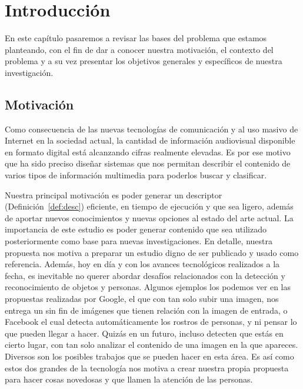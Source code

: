 \chapter[Introducción]{Introducción}\label{ch:capitulo1}
En este capítulo pasaremos a revisar las bases del problema que estamos planteando, con el fin de dar a conocer nuestra motivación, el contexto del problema y a su vez presentar los objetivos generales y específicos de nuestra investigación.


\section{Motivación}\label{chsub:Motivación}

Como consecuencia de las nuevas tecnologías de comunicación y al uso masivo de Internet en la sociedad actual, la cantidad de información audiovisual disponible en formato digital está alcanzando cifras realmente elevadas. Es por ese motivo que ha sido preciso diseñar sistemas que nos permitan describir el contenido de varios tipos de información multimedia para poderlos buscar y clasificar. 

Nuestra principal motivación es poder generar un descriptor (Definición~\ref{def:desc}) eficiente, en tiempo de ejecución y que sea ligero, además de aportar nuevos conocimientos y nuevas opciones al estado del arte actual. La importancia de este estudio es poder generar contenido que sea utilizado posteriormente como base para nuevas investigaciones. En detalle, nuestra propuesta nos motiva a preparar un estudio digno de ser publicado y usado como referencia. Además, hoy en día y con los avances tecnológicos realizados a la fecha, es inevitable no querer abordar desafíos relacionados con la detección y reconocimiento de objetos y personas. Algunos ejemplos los podemos ver en las propuestas realizadas por Google, el que con tan solo subir una imagen, nos entrega un sin fin de imágenes que tienen relación con la imagen de entrada, o Facebook el cual detecta automáticamente los rostros de personas, y ni pensar lo que pueden llegar a hacer. Quizás en un futuro, incluso detecten que estás en cierto lugar, con tan solo analizar el contenido de una imagen en la que apareces. Diversos son los posibles trabajos que se pueden hacer en esta área. Es así como estos dos grandes de la tecnología nos motiva a crear nuestra propia propuesta para hacer cosas novedosas y que llamen la atención de las personas.

